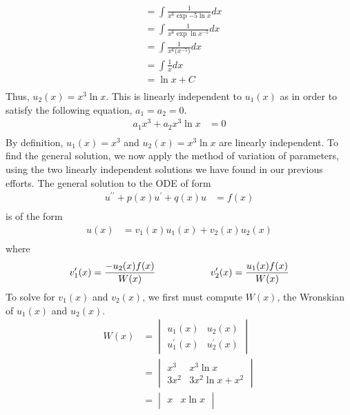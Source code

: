 \documentclass[a4paper]{article}
\newcommand{\ds}{\displaystyle}
\begin{document}
\begin{enumerate}
\begin{align*}
		& = \int\frac{1}{x^6\exp{-5\ln x}}dx\\
		& = \int\frac{1}{x^6\exp{\ln x^{-5}}}dx\\
		& = \int\frac{1}{x^6\big(x^{-5}\big)}dx\\
		& = \int\frac{1}{x}dx\\
		& = \ln x + C\\
	\end{align*}
	Thus, $\ds{u_{2}(x) = x^3\ln x}$. This is linearly independent to $\ds{u_{1}(x)}$ as in order to satisfy the following equation, $\ds{a_1 = a_2 = 0}$.
	\begin{align*}
		a_1x^3 + a_2x^3\ln x & = 0\\
	\end{align*}
	By definition, $\ds{u_{1}(x) = x^3}$ and $\ds{u_{2}(x) = x^3\ln x}$ are linearly independent.
	\bigbreak
	To find the general solution, we now apply the method of variation of parameters, using the two linearly independent solutions we have found in our previous efforts. The general solution to the ODE of form
	\begin{align*}
		u^{\prime\prime} + p(x)u^{\prime} + q(x)u & = f(x)\\
	\end{align*}
	is of the form
	\begin{align*}
		u(x) & = v_1(x)u_1(x) + v_2(x)u_2(x)\\
	\end{align*}
	where
	\begin{align*}
		v_1^{\prime}(x) & = \frac{-u_2(x)f(x)}{W(x)} \hspace{20mm}
		v_2^{\prime}(x) = \frac{u_1(x)f(x)}{W(x)}\\
	\end{align*}
	To solve for $\ds{v_1(x)}$ and $\ds{v_2(x)}$, we first must compute $\ds{W(x)}$, the Wronskian of $\ds{u_1(x)}$ and $\ds{u_2(x)}$.
	\begin{align*}
		W(x) & =
		\begin{vmatrix}
			u_1(x) & u_2(x)\\
			u_1^{\prime}(x) & u_2^{\prime}(x)
		\end{vmatrix}\\
		& =
		\begin{vmatrix}
			x^3 & x^3\ln x\\
			3x^2 & 3x^2\ln x + x^2
		\end{vmatrix}\\
		& =
		\begin{vmatrix}
			x & x\ln x\\

\end{vmatrix}
\end{align*}
\end{enumerate}
\end{document}
